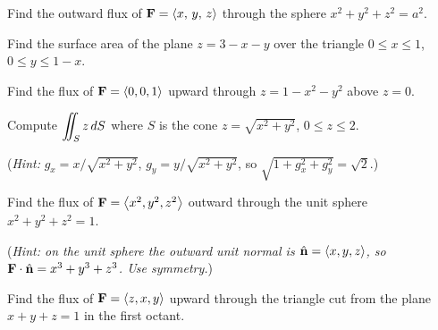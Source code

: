 \documentclass[11pt]{article}
\begin{document}
\begin{example}
Find the outward flux of $\mathbf{F} = \left\langle x,\, y,\, z \right\rangle$ through the sphere $x^2+y^2+z^2 = a^2$.

\end{example}

\begin{practice}

\prob
Find the surface area of the plane $z = 3 - x - y$ over the triangle $0 \le x \le 1$, $0 \le y \le 1-x$.


\vspace{3cm}

\prob
Find the flux of $\mathbf{F} = \left\langle 0, 0, 1 \right\rangle$ upward through $z = 1 - x^2 - y^2$ above $z = 0$.

\wans{$\wbm{\pi}$}

\vspace{3cm}

\prob
Compute $\displaystyle\iint_S z\,dS$ where $S$ is the cone $z = \sqrt{x^2+y^2}$, $0 \le z \le 2$.

(\textit{Hint: } $g_x = x/\sqrt{x^2+y^2}$, $g_y = y/\sqrt{x^2+y^2}$, so $\sqrt{1+g_x^2+g_y^2} = \sqrt{2}$.)


\vspace{4cm}

\prob
Find the flux of $\mathbf{F} = \left\langle x^2, y^2, z^2 \right\rangle$ outward through the unit sphere $x^2+y^2+z^2=1$.

(\textit{Hint: on the unit sphere the outward unit normal is $\hat{\mathbf{n}}=\left\langle x,y,z \right\rangle$, so $\mathbf{F}\cdot\hat{\mathbf{n}}=x^3+y^3+z^3$. Use symmetry.})


\vspace{4cm}

\prob
Find the flux of $\mathbf{F} = \left\langle z, x, y \right\rangle$ upward through the triangle cut from the plane $x + y + z = 1$ in the first octant.


\vspace{3.5cm}

\end{practice}
\end{document}
